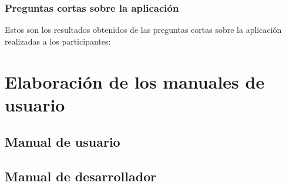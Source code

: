 \subsubsection{Preguntas cortas sobre la aplicación}
Estos son los resultados obtenidos de las preguntas cortas sobre la aplicación realizadas a los participantes:

\section{Elaboración de los manuales de usuario}
\subsection{Manual de usuario}

\subsection{Manual de desarrollador}
